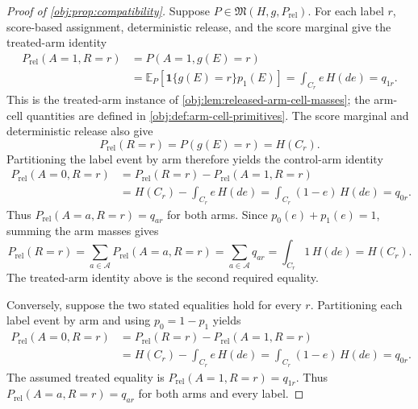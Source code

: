 \begin{proof}[Proof of \cref{obj:prop:compatibility}]
Suppose \(P\in\mathfrak M(H,g,P_{\mathrm{rel}})\). For each label \(r\), score-based assignment, deterministic release, and the score marginal give the treated-arm identity
\[
\begin{aligned}
P_{\mathrm{rel}}(A=1,R=r)
&=P(A=1,g(E)=r)\\
&=\mathbb E_P\!\left[\mathbf 1\{g(E)=r\}p_1(E)\right]
=\int_{C_r}e\,H(de)=q_{1r}.
\end{aligned}
\]
This is the treated-arm instance of \cref{obj:lem:released-arm-cell-masses}; the arm-cell quantities are defined in \cref{obj:def:arm-cell-primitives}. The score marginal and deterministic release also give
\[
P_{\mathrm{rel}}(R=r)=P(g(E)=r)=H(C_r).
\]
Partitioning the label event by arm therefore yields the control-arm identity
\[
\begin{aligned}
P_{\mathrm{rel}}(A=0,R=r)
&=P_{\mathrm{rel}}(R=r)-P_{\mathrm{rel}}(A=1,R=r)\\
&=H(C_r)-\int_{C_r}e\,H(de)
=\int_{C_r}(1-e)\,H(de)=q_{0r}.
\end{aligned}
\]
Thus \(P_{\mathrm{rel}}(A=a,R=r)=q_{ar}\) for both arms.
Since \(p_0(e)+p_1(e)=1\), summing the arm masses gives
\[
P_{\mathrm{rel}}(R=r)
=\sum_{a\in\mathcal A}P_{\mathrm{rel}}(A=a,R=r)
=\sum_{a\in\mathcal A}q_{ar}
=\int_{C_r}1\,H(de)
=H(C_r).
\]
The treated-arm identity above is the second required equality.

Conversely, suppose the two stated equalities hold for every \(r\). Partitioning each label event by arm and using \(p_0=1-p_1\) yields
\[
\begin{aligned}
P_{\mathrm{rel}}(A=0,R=r)
&=P_{\mathrm{rel}}(R=r)-P_{\mathrm{rel}}(A=1,R=r)\\
&=H(C_r)-\int_{C_r}e\,H(de)
=\int_{C_r}(1-e)\,H(de)=q_{0r}.
\end{aligned}
\]
The assumed treated equality is \(P_{\mathrm{rel}}(A=1,R=r)=q_{1r}\). Thus \(P_{\mathrm{rel}}(A=a,R=r)=q_{ar}\) for both arms and every label.


\end{proof}
